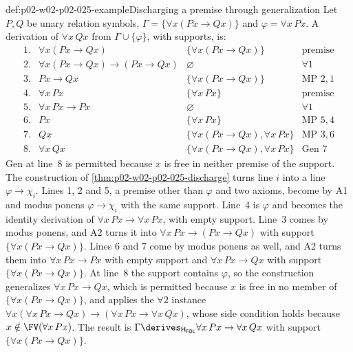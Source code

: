 \begin{hbexample}{def:p02-w02-p02-025-example}{Discharging a premise through generalization}
Let \(P,Q\) be unary relation symbols, \(\Gamma=\{\forall x(Px\to Qx)\}\) and
\(\varphi=\forall x\,Px\).  A derivation of \(\forall x\,Qx\) from
\(\Gamma\cup\{\varphi\}\), with supports, is:
\[
\begin{array}{llll}
 1. & \forall x(Px\to Qx) & \{\forall x(Px\to Qx)\} & \text{premise}\\
 2. & \forall x(Px\to Qx)\to(Px\to Qx) & \varnothing & \forall1\\
 3. & Px\to Qx & \{\forall x(Px\to Qx)\} & \text{MP }2,1\\
 4. & \forall x\,Px & \{\forall x\,Px\} & \text{premise}\\
 5. & \forall x\,Px\to Px & \varnothing & \forall1\\
 6. & Px & \{\forall x\,Px\} & \text{MP }5,4\\
 7. & Qx & \{\forall x(Px\to Qx),\forall x\,Px\} & \text{MP }3,6\\
 8. & \forall x\,Qx & \{\forall x(Px\to Qx),\forall x\,Px\} & \text{Gen }7
\end{array}
\]
Gen at line~8 is permitted because \(x\) is free in neither premise of the
support.  The construction of \cref{thm:p02-w02-p02-025-discharge} turns line
\(i\) into a line \(\varphi\to\chi_i\).  Lines 1, 2 and 5, a premise other
than \(\varphi\) and two axioms, become by A1 and modus ponens
\(\varphi\to\chi_i\) with the same support.  Line~4 is \(\varphi\) and becomes
the identity derivation of \(\forall x\,Px\to\forall x\,Px\), with empty
support.  Line~3 comes by modus ponens, and A2 turns it into
\(\forall x\,Px\to(Px\to Qx)\) with support \(\{\forall x(Px\to Qx)\}\).
Lines 6 and 7 come by modus ponens as well, and A2 turns them into
\(\forall x\,Px\to Px\) with empty support and
\(\forall x\,Px\to Qx\) with support \(\{\forall x(Px\to Qx)\}\).  At line~8
the support contains \(\varphi\), so the construction generalizes
\(\forall x\,Px\to Qx\), which is permitted because \(x\) is free in no
member of \(\{\forall x(Px\to Qx)\}\), and applies the \(\forall2\) instance
\(\forall x(\forall x\,Px\to Qx)\to(\forall x\,Px\to\forall x\,Qx)\), whose
side condition holds because \(x\notin\FV(\forall x\,Px)\).  The result is
\(\Gamma\derives_{\mathsf H_{\mathsf{FOL}}}\forall x\,Px\to\forall x\,Qx\)
with support \(\{\forall x(Px\to Qx)\}\).
\end{hbexample}

